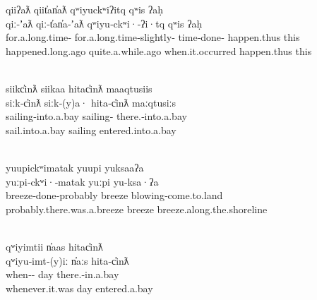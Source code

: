 \begin{exe}

  \ex\label{ex:3.18}
  \singlespacing
  \renewcommand{\eachwordfive}{\rule[-10pt]{0pt}{0pt}\rmfamily}

  \glllll qiiʔaƛ                   qiit̓an̓aƛ                          qʷiyuckʷiʔitq        qʷis        ʔaḥ\\
  qiː‑ʼaƛ                  qiː‑t̓an̓a‑ʼaƛ                      qʷiyu‑ckʷi·‑ʔi·tq    qʷis        ʔaḥ\\
  for.a.long.time‑ for.a.long.time‑slightly‑ time‑done‑ happen.thus this\\
  happened.long.ago        quite.a.while.ago                 when.it.occurred     happen.thus this\\
                                                           \\
  \vfix

  \glllll siikc̓inƛ           siikaa            hitac̓inƛ                  maaqtusiis\\
  siːk‑c̓inƛ          siːk‑(y)a·        hita‑c̓inƛ                 maːqtusiːs\\
  sailing‑into.a.bay sailing‑ there.‑into.a.bay \\
  sail.into.a.bay    sailing           entered.into.a.bay        \\
                                      \\
  \vfix

  \glllll yuupickʷimatak              yuupi    yuksaaʔa\\
  yuːpi‑ckʷi·‑matak           yuːpi    yu‑ksa·ʔa\\
  breeze‑done‑probably        breeze   blowing‑come.to.land\\
  probably.there.was.a.breeze breeze   breeze.along.the.shoreline\\
                      \\
  \vfix

  \glllll qʷiyimtii                   n̓aas     hitac̓inƛ\\
  qʷiyu‑imt‑(y)iː             n̓aːs     hita‑c̓inƛ\\
  when‑‑ day      there.‑in.a.bay\\
  whenever.it.was             day      entered.a.bay\\
                      \\
  \vfix


\end{exe}
